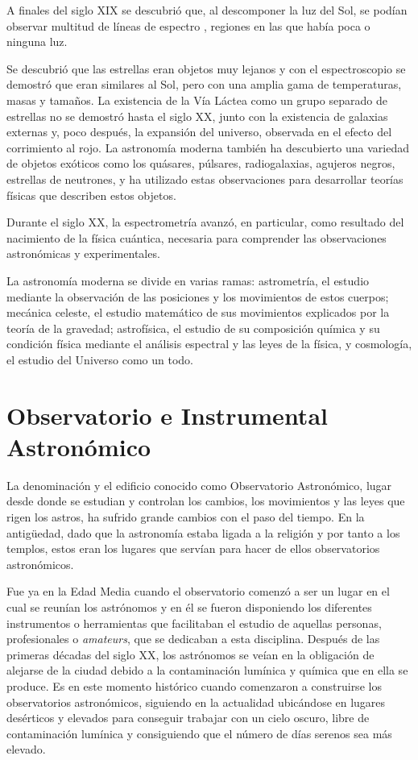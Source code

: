 A finales del siglo XIX se descubrió que, al descomponer la luz del Sol, se podían observar multitud de líneas de espectro , regiones en las que había poca o ninguna luz.

Se descubrió que las estrellas eran objetos muy lejanos y con el espectroscopio se demostró que eran similares al Sol, pero con una amplia gama de temperaturas, masas y tamaños. La existencia de la Vía Láctea como un grupo separado de estrellas no se demostró hasta el siglo XX, junto con la existencia de galaxias externas y, poco después, la expansión del universo, observada en el efecto del corrimiento al rojo. La astronomía moderna también ha descubierto una variedad de objetos exóticos como los quásares, púlsares, radiogalaxias, agujeros negros, estrellas de neutrones, y ha utilizado estas observaciones para desarrollar teorías físicas que describen estos objetos.

Durante el siglo XX, la espectrometría avanzó, en particular, como resultado del nacimiento de la física cuántica, necesaria para comprender las observaciones astronómicas y experimentales.

La astronomía moderna se divide en varias ramas: astrometría, el estudio mediante la observación de las posiciones y los movimientos de estos cuerpos; mecánica celeste, el estudio matemático de sus movimientos explicados por la teoría de la gravedad; astrofísica, el estudio de su composición química y su condición física mediante el análisis espectral y las leyes de la física, y cosmología, el estudio del Universo como un todo.

\section{Observatorio e Instrumental Astronómico}
La denominación y el edificio conocido como Observatorio Astronómico, lugar desde donde se estudian y controlan los cambios, los movimientos y las leyes que  rigen los astros, ha sufrido grande cambios con el paso del tiempo. En la antigüedad, dado que la astronomía estaba ligada a la religión y por tanto a los templos, estos eran los lugares que servían para hacer de ellos observatorios astronómicos.

Fue ya en la Edad Media cuando el observatorio comenzó a ser un lugar en el cual se reunían los astrónomos y en él se fueron disponiendo los diferentes instrumentos o herramientas que facilitaban el estudio de aquellas personas, profesionales o \textit{amateurs}, que se dedicaban a esta disciplina.
Después de las primeras décadas del siglo XX, los astrónomos se veían en la obligación de alejarse de la ciudad debido a la contaminación lumínica y química que en ella se produce. Es en este momento histórico cuando comenzaron a construirse los observatorios astronómicos, siguiendo en la actualidad ubicándose en lugares desérticos y elevados para conseguir trabajar con un cielo oscuro, libre de contaminación lumínica y consiguiendo que el número de días serenos sea más elevado.

